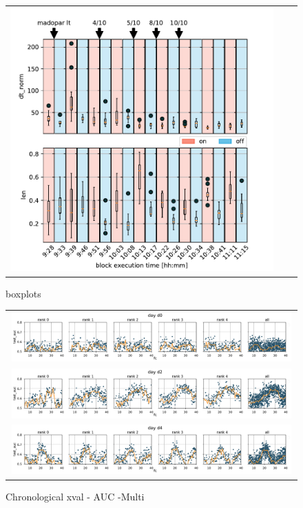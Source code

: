 \documentclass[10pt,a4paper]{article}
\begin{document}
\begin{figure}
\begin{tabular}{ccc}
	\includegraphics[width=\behwidth\textwidth]{figures//behavioral/d4_stats_scores_copyDraw}
\end{tabular}
\caption{boxplots}
\end{figure}

\newcommand{\perfwidth}{0.99}
\begin{figure}
\centering
\begin{tabular}{c}
	\includegraphics[width=\perfwidth\textwidth]{figures/par_sweep/test_auc_fc_d0_Chrono_Multi}\\
	\includegraphics[width=\perfwidth\textwidth]{figures/par_sweep/test_auc_fc_d2_Chrono_Multi}\\
	\includegraphics[width=\perfwidth\textwidth]{figures//par_sweep/test_auc_fc_d4_Chrono_Multi}
\end{tabular}
\caption{Chronological xval - AUC -Multi } 
\end{figure}
\end{document}
